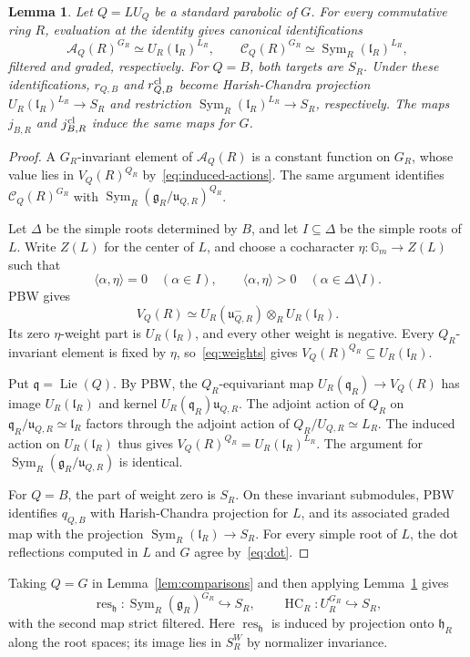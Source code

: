 \documentclass[twoside,a4paper,12pt,reqno]{amsart}
\newtheorem{lemma}[theorem]{Lemma}
\theoremstyle{remark}
\numberwithin{equation}{section}
\newcommand{\Gm}{\mathbb G_m}
\newcommand{\fg}{\mathfrak g}
\newcommand{\fh}{\mathfrak h}
\newcommand{\fl}{\mathfrak l}
\newcommand{\fq}{\mathfrak q}
\newcommand{\fu}{\mathfrak u}
\newcommand{\cA}{\mathcal A}
\DeclareMathOperator{\Sym}{Sym}
\DeclareMathOperator{\Lie}{Lie}
\DeclareMathOperator{\HC}{HC}
\newcommand{\into}{\hookrightarrow}
\begin{document}
\begin{lemma}\label{lem:levi}
Let \(Q=LU_Q\) be a standard parabolic of \(G\).
For every commutative ring \(R\), evaluation at the identity gives
canonical identifications
\[
\cA_Q(R)^{G_R}\simeq U_R(\fl_R)^{L_R},
\qquad
\mathcal C_Q(R)^{G_R}\simeq\Sym_R(\fl_R)^{L_R},
\]
filtered and graded, respectively. For \(Q=B\), both targets are
\(S_R\). Under these identifications, \(r_{Q,B}\) and \(r^{\rm cl}_{Q,B}\)
become Harish-Chandra projection \(U_R(\fl_R)^{L_R}\to S_R\)
and restriction \(\Sym_R(\fl_R)^{L_R}\to S_R\), respectively.
The maps \(j_{B,R}\) and \(j^{\rm cl}_{B,R}\) induce the same maps
for \(G\).
\end{lemma}
\begin{proof}
A \(G_R\)-invariant element of \(\cA_Q(R)\) is a constant function
on \(G_R\), whose value lies in \(V_Q(R)^{Q_R}\)
by~\eqref{eq:induced-actions}.
The same argument identifies \(\mathcal C_Q(R)^{G_R}\) with
\(\Sym_R(\fg_R/\fu_{Q,R})^{Q_R}\).

Let \(\Delta\) be the simple roots determined by \(B\), and let
\(I\subseteq\Delta\) be the simple roots of \(L\).
Write \(Z(L)\) for the center of \(L\), and choose a cocharacter
\(\eta:\Gm\to Z(L)\) such that
\[
\langle\alpha,\eta\rangle=0\quad(\alpha\in I),
\qquad
\langle\alpha,\eta\rangle>0\quad(\alpha\in\Delta\setminus I).
\]
PBW gives
\[
V_Q(R)\simeq U_R(\fu_{Q,R}^-)\otimes_R U_R(\fl_R).
\]
Its zero \(\eta\)-weight part is \(U_R(\fl_R)\), and every other
weight is negative. Every \(Q_R\)-invariant element is fixed by
\(\eta\), so~\eqref{eq:weights} gives
\(V_Q(R)^{Q_R}\subseteq U_R(\fl_R)\).

Put \(\fq=\Lie(Q)\). By PBW, the \(Q_R\)-equivariant map
\(U_R(\fq_R)\to V_Q(R)\) has image \(U_R(\fl_R)\) and kernel
\(U_R(\fq_R)\fu_{Q,R}\).
The adjoint action of \(Q_R\) on \(\fq_R/\fu_{Q,R}\simeq\fl_R\)
factors through the adjoint action of \(Q_R/U_{Q,R}\simeq L_R\).
The induced action on \(U_R(\fl_R)\) thus gives
\(V_Q(R)^{Q_R}=U_R(\fl_R)^{L_R}\). The argument for 
\(\Sym_R(\fg_R/\fu_{Q,R})\) is identical.

For \(Q=B\), the part of weight zero is \(S_R\).
On these invariant submodules, PBW identifies \(q_{Q,B}\) with
Harish-Chandra projection for \(L\), and its associated graded map
with the projection \(\Sym_R(\fl_R)\to S_R\).
For every simple root of \(L\), the dot reflections computed in
\(L\) and \(G\) agree by~\eqref{eq:dot}.
\end{proof}

Taking \(Q=G\) in Lemma~\ref{lem:comparisons} and then applying
Lemma~\ref{lem:levi} gives
\begin{equation}\label{eq:invariant-embeddings}
\operatorname{res}_{\fh}:\Sym_R(\fg_R)^{G_R}\into S_R,
\qquad
\HC_R:U_R^{G_R}\into S_R,
\end{equation}
with the second map strict filtered. Here
\(\operatorname{res}_{\fh}\) is induced by projection onto \(\fh_R\)
along the root spaces; its image lies in \(S_R^W\) by normalizer
invariance.
\end{document}
